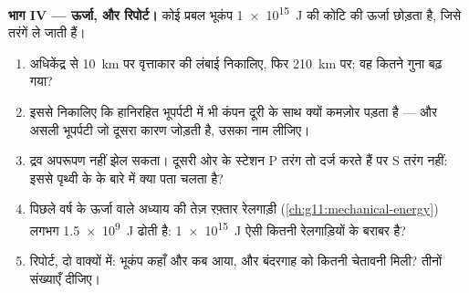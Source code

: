 \begin{problem}
\medskip
\noindent\textbf{भाग IV --- ऊर्जा, और रिपोर्ट।}
कोई प्रबल भूकंप \qty{1e15}{J} की कोटि की ऊर्जा छोड़ता है, जिसे तरंगें ले
जाती हैं।
\begin{enumerate}[resume]
  \item अधिकेंद्र से \qty{10}{km} पर वृत्ताकार  की लंबाई
        निकालिए, फिर \qty{210}{km} पर; वह कितने गुना बढ़ गया?
  \item इससे निकालिए कि हानिरहित भूपर्पटी में भी कंपन दूरी के साथ क्यों
        कमज़ोर पड़ता है --- और असली भूपर्पटी जो दूसरा कारण जोड़ती है, उसका
        नाम लीजिए।
  \item द्रव अपरूपण नहीं झेल सकता। दूसरी ओर के स्टेशन P तरंग तो
        दर्ज करते हैं पर S तरंग नहीं: इससे पृथ्वी के  के बारे
        में क्या पता चलता है?
  \item पिछले वर्ष के ऊर्जा वाले अध्याय की तेज़ रफ़्तार रेलगाड़ी
        (\cref{ch:g11:mechanical-energy}) लगभग \qty{1.5e9}{J}  ढोती है: \qty{1e15}{J} ऐसी कितनी
        रेलगाड़ियों के बराबर है?
  \item रिपोर्ट, दो वाक्यों में: भूकंप कहाँ और कब आया, और बंदरगाह को कितनी
        चेतावनी मिली? तीनों संख्याएँ दीजिए।
\end{enumerate}
\end{problem}
